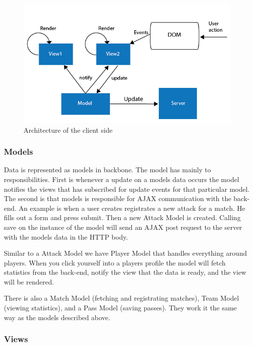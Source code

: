 
\begin{figure}[ht!]
\centering
\includegraphics[width=150mm]{images/architecture/backbone_architecture.png}
\caption{Architecture of the client side}
\label{overflow}
\end{figure}

\subsubsection{Models}

Data is represented as models in backbone. The model has mainly to responsibilities. First is whenever a update on a models data occurs the model notifies the views that has subscribed for update events for that particular model. The second is that models is responsible for AJAX communication  with the back-end. An example is when a user creates registrates a new attack for a match. He fills out a form and press submit. Then a new Attack Model is created. Calling save on the instance of the model will send an AJAX post request to the server with the models data in the HTTP body.

Similar to a Attack Model we have Player Model that handles everything around players. When you click yourself into a players profile the model will fetch statistics from the back-end, notify the view that the data is ready, and the view will be rendered.

There is also a Match Model (fetching and registrating matches), Team Model (viewing statistics), and a Pass Model (saving passes). They work it the same way as the models described above.


\subsubsection{Views}

